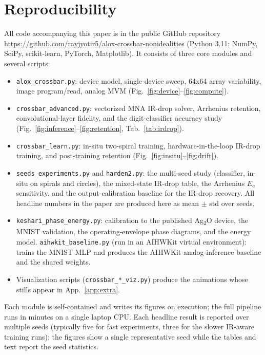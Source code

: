 \section{Reproducibility}
\label{app:repro}
All code accompanying this paper is in the public GitHub repository
\url{https://github.com/rayjyotir5/alox-crossbar-nonidealities} (Python 3.11;
NumPy, SciPy, scikit-learn, PyTorch, Matplotlib). It consists of three core
modules and several scripts:
\begin{itemize}
\item \texttt{alox\_crossbar.py}: device model, single-device sweep, 64x64 array
variability, image program/read, analog MVM (Fig.~\ref{fig:device}--\ref{fig:compute}).
\item \texttt{crossbar\_advanced.py}: vectorized MNA IR-drop solver, Arrhenius
retention, convolutional-layer fidelity, and the digit-classifier accuracy study
(Fig.~\ref{fig:inference}--\ref{fig:retention}, Tab.~\ref{tab:irdrop}).
\item \texttt{crossbar\_learn.py}: in-situ two-spiral training, hardware-in-the-loop
IR-drop training, and post-training retention (Fig.~\ref{fig:insitu}--\ref{fig:drift}).
\item \texttt{seeds\_experiments.py} and \texttt{harden2.py}: the multi-seed
study (classifier, in-situ on spirals and circles), the mixed-state IR-drop
table, the Arrhenius $E_a$ sensitivity, and the output-calibration baseline for
the IR-drop recovery. All headline numbers in the paper are produced here as
mean $\pm$ std over seeds.
\item \texttt{keshari\_phase\_energy.py}: calibration to the published
Ag\textsubscript{2}O device, the MNIST validation, the operating-envelope phase
diagrams, and the energy model. \texttt{aihwkit\_baseline.py} (run in an AIHWKit
virtual environment): trains the MNIST MLP and produces the AIHWKit analog-inference
baseline and the shared weights.
\item Visualization scripts (\texttt{crossbar\_*\_viz.py}) produce the animations
whose stills appear in App.~\ref{app:extra}.
\end{itemize}
Each module is self-contained and writes its figures on execution; the full
pipeline runs in minutes on a single laptop CPU. Each headline result is reported
over multiple seeds (typically five for fast experiments, three for the slower
IR-aware training runs); the figures show a single representative seed while the
tables and text report the seed statistics.

